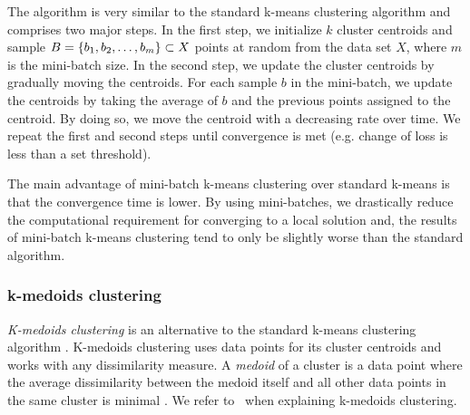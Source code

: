 The algorithm is very similar to the standard k-means clustering algorithm and comprises two major steps. In the first step, we initialize $k$ cluster centroids and sample $B=\left\{b_1, b_2, \ldots, b_m\right\} \subset X$ points at random from the data set $X$, where $m$ is the mini-batch size. In the second step, we update the cluster centroids by gradually moving the centroids. For each sample $b$ in the mini-batch, we update the centroids by taking the average of $b$ and the previous points assigned to the centroid. By doing so, we move the centroid with a decreasing rate over time. We repeat the first and second steps until convergence is met (e.g. change of loss is less than a set threshold).

The main advantage of mini-batch k-means clustering over standard k-means is that the convergence time is lower. By using mini-batches, we drastically reduce the computational requirement for converging to a local solution and, the results of mini-batch k-means clustering tend to only be slightly worse than the standard algorithm.

\subsubsection{k-medoids clustering}
\label{sec:k-medoids-clustering}
\textit{K-medoids clustering} is an alternative to the standard k-means clustering algorithm \cites{Kaufman1990}[p. 427 - 428]{bishop2006}. K-medoids clustering uses data points for its cluster centroids and works with any dissimilarity measure. A \textit{medoid} of a cluster is a data point where the average dissimilarity between the medoid itself and all other data points in the same cluster is minimal \cite{Kaufman1990}. We refer to \cites{Kaufman1990}[p. 427 - 428]{bishop2006}\, when explaining k-medoids clustering.

